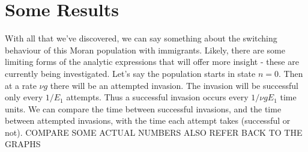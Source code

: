 \section{Some Results}
With all that we've discovered, we can say something about the switching behaviour of this Moran population with immigrants. 
Likely, there are some limiting forms of the analytic expressions that will offer more insight - these are currently being investigated. 
Let's say the population starts in state $n=0$.  
Then at a rate $\nu g$ there will be an attempted invasion.  
The invasion will be successful only every $1/E_1$ attempts.  
Thus a successful invasion occurs every $1/\nu g E_1$ time units.  
We can compare the time between successful invasions, and the time between attempted invasions, with the time each attempt takes (successful or not). 
COMPARE SOME ACTUAL NUMBERS
ALSO REFER BACK TO THE GRAPHS


